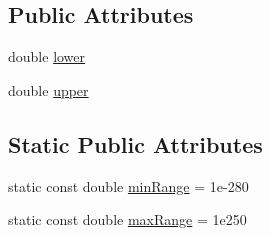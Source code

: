 \subsection*{Public Attributes}
\begin{DoxyCompactItemize}
\item 
double \mbox{\hyperlink{class_q_c_p_range_aa3aca3edb14f7ca0c85d912647b91745}{lower}}
\item 
double \mbox{\hyperlink{class_q_c_p_range_ae44eb3aafe1d0e2ed34b499b6d2e074f}{upper}}
\end{DoxyCompactItemize}
\subsection*{Static Public Attributes}
\begin{DoxyCompactItemize}
\item 
static const double \mbox{\hyperlink{class_q_c_p_range_ab46d3bc95030ee25efda41b89e2b616b}{min\+Range}} = 1e-\/280
\item 
static const double \mbox{\hyperlink{class_q_c_p_range_a5ca51e7a2dc5dc0d49527ab171fe1f4f}{max\+Range}} = 1e250
\end{DoxyCompactItemize}
